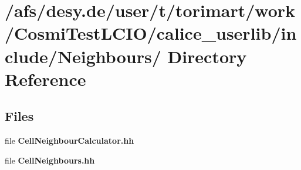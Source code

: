 \section{/afs/desy.de/user/t/torimart/work/CosmiTestLCIO/calice\_\-userlib/include/Neighbours/ Directory Reference}
\label{dir_5f45e332d1ab85b1c31e8d1024bc6e6e}
\subsection*{Files}
\begin{DoxyCompactItemize}
\item 
file {\bfseries CellNeighbourCalculator.hh}
\item 
file {\bfseries CellNeighbours.hh}
\end{DoxyCompactItemize}
